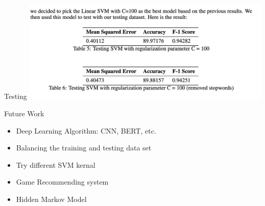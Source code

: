 \documentclass{beamer}
\begin{document}
\begin{frame}{Testing}
\includegraphics[width=0.9\textwidth]{testing.png}
    
\end{frame}

\begin{frame}{Future Work}
\begin{itemize}
    \item Deep Learning Algorithm: CNN, BERT, etc.
    \item Balancing the training and testing data set
    \item Try different SVM kernal
    \item Game Recommending system
    \item Hidden Markov Model
\end{itemize}
\end{frame}
\end{document}
